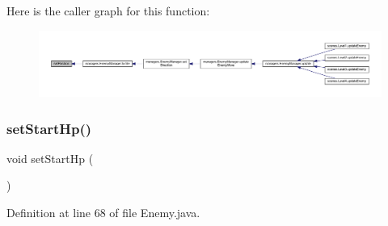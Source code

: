 Here is the caller graph for this function\+:\nopagebreak
\begin{figure}[H]
\begin{center}
\leavevmode
\includegraphics[width=350pt]{classenemies_1_1_enemy_ad6c107fadf835c74a229f8cac0cc98ab_icgraph}
\end{center}
\end{figure}
\mbox{\label{classenemies_1_1_enemy_a36ff8539de48d58a670cd19251abe658}} 
\subsubsection{\texorpdfstring{set\+Start\+Hp()}{setStartHp()}}
{\footnotesize\ttfamily void set\+Start\+Hp (\begin{DoxyParamCaption}{ }\end{DoxyParamCaption})\hspace{0.3cm}{\ttfamily [protected]}}



Definition at line 68 of file Enemy.\+java.

